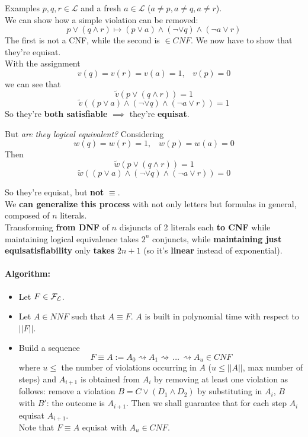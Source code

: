 \documentclass[11pt]{article}
\begin{document}
	Examples $p,q,r \in \mathcal{L}$ and a fresh $a \in \mathcal{L}$ ($a \neq p, a \neq q, a \neq r$).\\
	We can show how a simple violation can be removed:
	$$ p \vee (q \wedge r) \mapsto (p \vee a) \wedge (\neg \vee q) \wedge (\neg a \vee r) $$
	The first is not a CNF, while the second is $\in CNF$. We now have to show that they're equisat.\\
	
	With the assignment 
	$$ v(q) = v(r) = v(a) = 1, \;\;\; v(p) = 0$$
	we can see that 
	$$ \tilde v (p \vee (q \wedge r)) = 1 $$
	$$ \tilde v ((p \vee a) \wedge (\neg \vee q) \wedge (\neg a \vee r)) = 1$$
	So they're \textbf{both satisfiable} $\implies$ they're \textbf{equisat}.
	
	\newpage
	
	But \textit{are they logical equivalent?} Considering
	$$ w(q) = w(r) = 1, \;\;\; w(p) = w(a) = 0$$
	Then 
	$$ \tilde w (p \vee (q \wedge r)) = 1 $$
	$$ \tilde w ((p \vee a) \wedge (\neg \vee q) \wedge (\neg a \vee r)) = 0$$
	
	So they're equisat, but \textbf{not} $\equiv$.\\
	
	We \textbf{can generalize this process} with not only letters but formulas in general, composed of $n$ literals.\\
	
	Transforming \textbf{from DNF} of $n$ disjuncts of 2 literals each \textbf{to CNF} while maintaining logical equivalence takes $2^n$ conjuncts, while \textbf{maintaining just equisatisfiability} only \textbf{takes} $2n+1$ (so it's \textbf{linear} instead of exponential).\\
	
	\paragraph{Algorithm:} 
	\begin{itemize}
		\item Let $F \in \mathcal{F}_\mathcal{L}$.\\
		
		\item Let $A \in NNF$ such that $A \equiv F$. $A$ is built in polynomial time with respect to $||F||$.\\
		
		\item Build a sequence 
		$$ F \equiv A := A_0 \rightsquigarrow A_1 \rightsquigarrow\, \dots \, \rightsquigarrow A_u \in CNF $$
		where $u \leq$ the number of violations occurring in $A$ ($u \leq ||A||$, max number of steps) and $A_{i+1}$ is obtained from $A_i$ by removing at least one violation as follows: remove a violation $B = C \vee (D_1 \wedge D_2)$ by substituting in $A_i$, $B$ with $B'$: the outcome is $A_{i+1}$. Then we shall guarantee that for each step $A_i$ equisat $A_{i+1}$. \\
		Note that $F \equiv A$ equisat with $A_u \in CNF$.\\
	\end{itemize}
	
\end{document}
